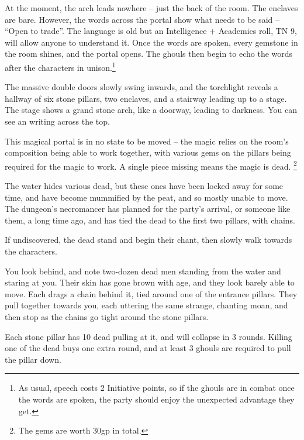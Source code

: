 \begin{multicols}{2}
At the moment, the arch leads nowhere  -- just the back of the room.  The enclaves are bare.
However, the words across the portal show what needs to be said -- ``Open to trade''.
The language is old but an Intelligence + Academics roll, TN 9, will allow anyone to understand it.
Once the words are spoken, every gemstone in the room shines, and the portal opens.
The ghouls then begin to echo the words after the characters in unison.\footnote{As usual, speech costs 2 Initiative points, so if the ghouls are in combat once the words are spoken, the party should enjoy the unexpected advantage they get.}

\begin{boxtext}

  The massive double doors slowly swing inwards, and the torchlight reveals a hallway of six stone pillars, two enclaves, and a stairway leading up to a stage.  The stage shows a grand stone arch, like a doorway, leading to darkness.
  You can see an writing across the top.

\end{boxtext}

This magical portal is in no state to be moved -- the magic relies on the room's composition being able to work together, with various gems on the pillars being required for the magic to work.
A single piece missing means the magic is dead.%
\footnote{The gems are worth 30gp in total.}

The water hides various dead, but these ones have been locked away for some time, and have become mummified by the peat, and so mostly unable to move.  The dungeon's necromancer has planned for the party's arrival, or someone like them, a long time ago, and has tied the dead to the first two pillars, with chains.

If undiscovered, the dead stand and begin their chant, then slowly walk towards the characters.

\begin{boxtext}

  You look behind, and note two-dozen dead men standing from the water and staring at you.
  Their skin has gone brown with age, and they look barely able to move.
  Each drags a chain behind it, tied around one of the entrance pillars.
  They pull together towards you, each uttering the same strange, chanting moan, and then stop as the chains go tight around the stone pillars.

\end{boxtext}

Each stone pillar has 10 dead pulling at it, and will collapse in 3 rounds.  Killing one of the dead buys one extra round, and at least 3 ghouls are required to pull the pillar down.


\end{multicols}
